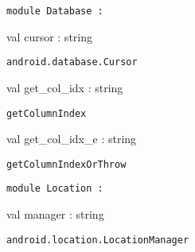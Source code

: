 \documentclass[11pt]{article}
\begin{document}
\begin{ocamldoccode}
{\tt{module }}{\tt{Database}}{\tt{ : }}\end{ocamldoccode}
\label{module:Android.Database}

\begin{ocamldocsigend}


\label{val:Android.Database.cursor}\begin{ocamldoccode}
val cursor : string
\end{ocamldoccode}
\begin{ocamldocdescription}
{\tt{android.database.Cursor}}


\end{ocamldocdescription}


\label{val:Android.Database.get-underscorecol-underscoreidx}\begin{ocamldoccode}
val get_col_idx : string
\end{ocamldoccode}
\begin{ocamldocdescription}
{\tt{getColumnIndex}}


\end{ocamldocdescription}


\label{val:Android.Database.get-underscorecol-underscoreidx-underscoree}\begin{ocamldoccode}
val get_col_idx_e : string
\end{ocamldoccode}
\begin{ocamldocdescription}
{\tt{getColumnIndexOrThrow}}


\end{ocamldocdescription}
\end{ocamldocsigend}






\begin{ocamldoccode}
{\tt{module }}{\tt{Location}}{\tt{ : }}\end{ocamldoccode}
\label{module:Android.Location}

\begin{ocamldocsigend}


\label{val:Android.Location.manager}\begin{ocamldoccode}
val manager : string
\end{ocamldoccode}
\begin{ocamldocdescription}
{\tt{android.location.LocationManager}}


\end{ocamldocdescription}
\end{ocamldocsigend}
\end{document}
